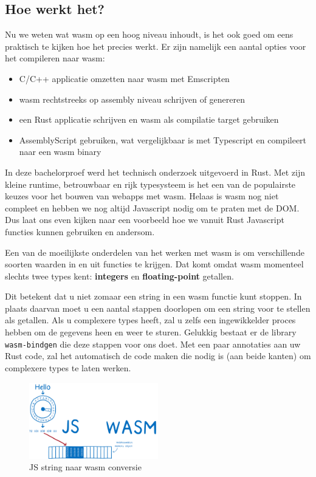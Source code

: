 \subsection{Hoe werkt het?}

Nu we weten wat wasm op een hoog niveau inhoudt, is het ook goed om eens praktisch te kijken hoe het
precies werkt. Er zijn namelijk een aantal opties voor het compileren naar wasm: 

\begin{itemize}
  \item C/C++ applicatie omzetten naar wasm met Emscripten 

  \item wasm rechtstreeks op assembly niveau schrijven of genereren 

  \item een Rust applicatie schrijven en wasm als compilatie target gebruiken 

  \item AssemblyScript gebruiken, wat vergelijkbaar is met Typescript en compileert naar een wasm
    binary 
\end{itemize}

In deze bachelorproef werd het technisch onderzoek uitgevoerd in Rust. Met zijn kleine runtime,
betrouwbaar en rijk typesysteem is het een van de populairste keuzes voor het bouwen van webapps met
wasm. Helaas is wasm nog niet compleet en hebben we nog altijd Javascript nodig om te praten met de
DOM. Dus laat ons even kijken naar een voorbeeld hoe we vanuit Rust Javascript functies kunnen
gebruiken en andersom.

Een van de moeilijkste onderdelen van het werken met wasm is om verschillende soorten waarden in en
uit functies te krijgen. Dat komt omdat wasm momenteel slechts twee types kent: \textbf{integers} en
\textbf{floating-point} getallen. 

Dit betekent dat u niet zomaar een string in een wasm functie kunt stoppen. In plaats daarvan moet
u een aantal stappen doorlopen om een string voor te stellen als getallen. Als u complexere types
heeft, zal u zelfs een ingewikkelder proces hebben om de gegevens heen en weer te sturen. Gelukkig
bestaat er de library \texttt{wasm-bindgen} die deze stappen voor ons doet. Met een paar
annotaties aan uw Rust code, zal het automatisch de code maken die nodig is (aan beide kanten) om
complexere types te laten werken.

\begin{figure}[h]
  \centering
  \includegraphics[width=0.5\textwidth]{figures/wasm_bindgen.png}
  \caption{JS string naar wasm conversie}
\end{figure}

